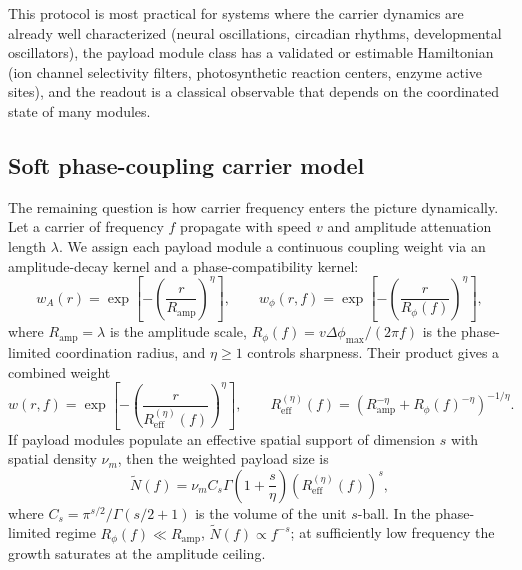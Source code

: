 \documentclass[11pt,a4paper]{article}
\theoremstyle{definition}
\theoremstyle{remark}
\begin{document}
This protocol is most practical for systems where the carrier dynamics are already well characterized (neural oscillations, circadian rhythms, developmental oscillators), the payload module class has a validated or estimable Hamiltonian (ion channel selectivity filters, photosynthetic reaction centers, enzyme active sites), and the readout is a classical observable that depends on the coordinated state of many modules.

\subsection{Soft phase-coupling carrier model}
\label{sec:bridge}

The remaining question is how carrier frequency enters the picture dynamically. Let a carrier of frequency $f$ propagate with speed $v$ and amplitude attenuation length $\lambda$. We assign each payload module a continuous coupling weight via an amplitude-decay kernel and a phase-compatibility kernel:
\begin{equation}
\label{eq:entrained-set}
w_A(r)=\exp\!\left[-\left(\frac{r}{R_{\mathrm{amp}}}\right)^\eta\right],
\qquad
w_\phi(r,f)=\exp\!\left[-\left(\frac{r}{R_\phi(f)}\right)^\eta\right],
\end{equation}
where $R_{\mathrm{amp}}=\lambda$ is the amplitude scale, $R_\phi(f)=v\Delta\phi_{\max}/(2\pi f)$ is the phase-limited coordination radius, and $\eta\ge1$ controls sharpness. Their product gives a combined weight
\begin{equation}
\label{eq:dcoord-scaling}
w(r,f)
=
\exp\!\left[-\left(\frac{r}{R_{\mathrm{eff}}^{(\eta)}(f)}\right)^\eta\right],
\qquad
R_{\mathrm{eff}}^{(\eta)}(f)=
\left(R_{\mathrm{amp}}^{-\eta}+R_\phi(f)^{-\eta}\right)^{-1/\eta}.
\end{equation}
If payload modules populate an effective spatial support of dimension $s$ with spatial density $\nu_m$, then the weighted payload size is
\begin{equation}
\label{eq:soft-payload-count}
\widetilde N(f)=
\nu_m C_s \Gamma\!\left(1+\frac{s}{\eta}\right)
\left(R_{\mathrm{eff}}^{(\eta)}(f)\right)^s,
\end{equation}
where $C_s=\pi^{s/2}/\Gamma(s/2+1)$ is the volume of the unit $s$-ball. In the phase-limited regime $R_\phi(f)\ll R_{\mathrm{amp}}$, $\widetilde N(f)\propto f^{-s}$; at sufficiently low frequency the growth saturates at the amplitude ceiling.
\end{document}
